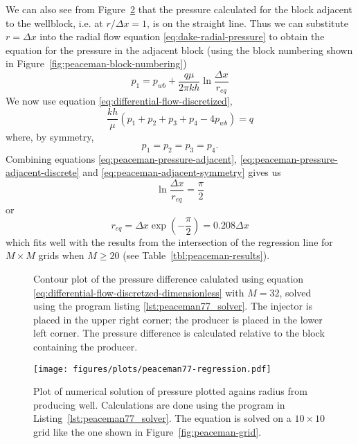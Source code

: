 We can also see from Figure~\ref{fig:peaceman77_pressure_vs_radius} that the pressure calculated for the block adjacent to the wellblock, i.e. at $r/\Delta x=1$, is on the straight line. Thus we can substitute $r=\Delta x$ into the radial flow equation \eqref{eq:dake-radial-pressure} to obtain the equation for the pressure in the adjacent block (using the block numbering shown in Figure~\ref{fig:peaceman-block-numbering})
\begin{equation}
    \label{eq:peaceman-pressure-adjacent}
    p_1 = p_{wb} + \frac{q\mu}{2\pi kh} \ln{\frac{\Delta x}{r_{eq}}}
\end{equation}
We now use equation \eqref{eq:differential-flow-discretized},
\begin{equation}
    \label{eq:peaceman-pressure-adjacent-discrete}
    \frac{kh}{\mu} \left( p_1 + p_2 + p_3 + p_4 -4p_{wb}  \right) = q
\end{equation}
where, by symmetry,
\begin{equation}
    \label{eq:peaceman-adjacent-symmetry}
    p_1=p_2=p_3=p_4.
\end{equation}
Combining equations \eqref{eq:peaceman-pressure-adjacent}, \eqref{eq:peaceman-pressure-adjacent-discrete} and \eqref{eq:peaceman-adjacent-symmetry} gives us
\begin{equation}
    \ln{\frac{\Delta x}{r_{eq}}} = \frac{\pi}{2}
\end{equation}
or
\begin{equation}
    r_{eq} = \Delta x \exp{\left( -\frac{\pi}{2} \right)} = 0.208 \Delta x
\end{equation}
which fits well with the results from the intersection of the regression line for $M\times M$ grids when $M\geq 20$ (see Table~\ref{tbl:peaceman-results}).

\begin{figure}[htbp]
    \centering
    \scalebox{0.7}{}
    \caption{Contour plot of the pressure difference calulated using equation \eqref{eq:differential-flow-discretzed-dimensionless} with $M=32$, solved using the program listing \ref{lst:peaceman77_solver}. The injector is placed in the upper right corner; the producer is placed in the lower left corner. The pressure difference is calculated relative to the block containing the producer.}
    \label{fig:pressure_drop_contour}
\end{figure}

\begin{figure}[htbp]
    \centering
    \texttt{[image: figures/plots/peaceman77-regression.pdf]}
    \caption{Plot of numerical solution of pressure plotted agains radius from producing well. Calculations are done using the program in Listing~\ref{lst:peaceman77_solver}. The equation is solved on a $10\times 10$ grid like the one shown in Figure~\ref{fig:peaceman-grid}.}
    \label{fig:peaceman77_pressure_vs_radius}
\end{figure}

